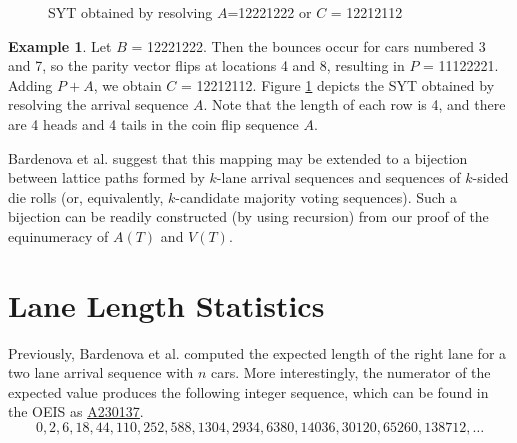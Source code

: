 \documentclass[article]{amsart}
\theoremstyle{plain}
\theoremstyle{definition}
\newtheorem{example}{Example}
\newcommand{\seqnum}[1]{\href{https://oeis.org/#1}{\rm \underline{A#1}}}
\begin{document}
\begin{figure}[h!]   
\caption{SYT obtained by resolving $A$=12221222 or $C$ = 12212112}
\label{fig:bijsyt} 
\end{figure}
\begin{example} \label{ex:bij}
Let $B$ = 12221222. Then the bounces occur for cars numbered 3 and 7, so the parity vector flips at locations 4 and 8, resulting in $P$ = 11122221. Adding $P + A$, we obtain $C$ = 12212112. Figure \ref{fig:bijsyt} depicts the SYT obtained by resolving the arrival sequence $A$. Note that the length of each row is 4, and there are 4 heads and 4 tails in the coin flip sequence $A$. 
\end{example}

Bardenova et al. \cite{bard} suggest that this mapping may be extended to a bijection between lattice paths formed by $k$-lane arrival sequences and sequences of $k$-sided die rolls (or, equivalently, $k$-candidate majority voting sequences).
Such a bijection can be readily constructed (by using recursion) from our proof of the equinumeracy of $A(T)$ and $V(T)$.


\section{Lane Length Statistics} \label{sec:stats}

Previously, Bardenova et al. \cite{bard} computed the expected length of the right lane for a two lane arrival sequence with $n$ cars. More interestingly, the numerator of the expected value produces the following integer sequence, which can be found in the OEIS \cite{oeis} as \seqnum{230137}.  
\[ 0, 2, 6, 18, 44, 110, 252, 588, 1304, 2934, 6380, 14036, 30120, 65260, 138712, \dots \]
\end{document}
